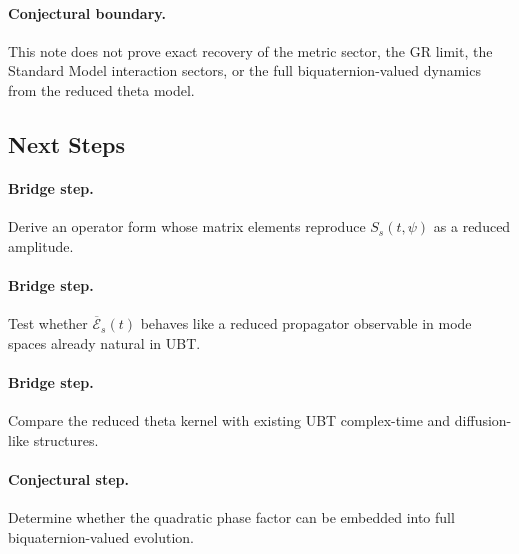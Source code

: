 \documentclass[11pt,a4paper]{article}
\begin{document}
\paragraph{Conjectural boundary.}
This note does not prove exact recovery of the metric sector, the GR limit, the Standard Model interaction sectors, or the full biquaternion-valued dynamics from the reduced theta model.

\subsection{Next Steps}

\paragraph{Bridge step.}
Derive an operator form whose matrix elements reproduce $S_s(t,\psi)$ as a reduced amplitude.

\paragraph{Bridge step.}
Test whether $\overline{\mathcal{E}}_s(t)$ behaves like a reduced propagator observable in mode spaces already natural in UBT.

\paragraph{Bridge step.}
Compare the reduced theta kernel with existing UBT complex-time and diffusion-like structures.

\paragraph{Conjectural step.}
Determine whether the quadratic phase factor can be embedded into full biquaternion-valued evolution.
\end{document}
